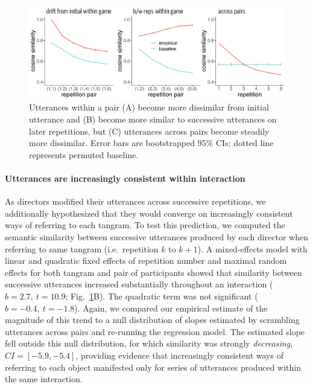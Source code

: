 \documentclass[alpha-refs]{wiley-article}
\begin{document}
\begin{figure}
\includegraphics[scale=.52]{similarity_analysis.pdf}
\caption{Utterances within a pair (A) become more dissimilar from initial utterance and (B) become more similar to successive utterances on later repetitions, but (C) utterances across pairs become steadily more dissimilar. Error bars are bootstrapped 95\% CIs; dotted line represents permuted baseline.}
\label{fig:similarity}
\end{figure}

\paragraph{Utterances are increasingly consistent within interaction}

As directors modified their utterances across successive repetitions, we additionally hypothesized that they would converge on increasingly consistent ways of referring to each tangram.
To test this prediction, we computed the semantic similarity between successive utterances produced by each director when referring to same tangram (i.e.~repetition $k$ to $k+1$). %
A mixed-effects model with linear and quadratic fixed effects of repetition number and maximal random effects for both tangram and pair of participants showed that similarity between successive utterances increased substantially throughout an interaction ($b = 2.7,~t = 10.9$; Fig.~\ref{fig:similarity}B). 
The quadratic term was not significant ($b= -0.4,~t=-1.8$).
Again, we compared our empirical estimate of the magnitude of this trend to a null distribution of slopes estimated by scrambling utterances across pairs and re-running the regression model.%
The estimated slope fell outside this null distribution, for which similarity was strongly \emph{decreasing}, $CI = [-5.9, -5.4]$, providing evidence that increasingly consistent ways of referring to each object manifested only for series of utterances produced within the same interaction.
\end{document}
